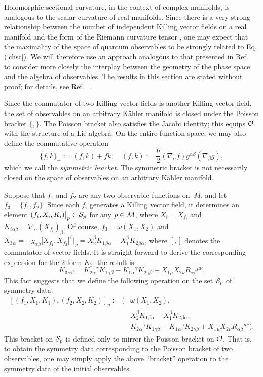 \documentclass[12pt,aps,eqsecnum,tighten]{revtex4-2}
\def\be{\begin{equation}}
\def\ee{\end{equation}}
\def\a{\alpha}
\def\b{\beta}
\def\c{\gamma}
\def\grad{\nabla}
\def\M{{\cal M}}
\def\w{\omega}
\newcommand{\hvf}[1]{{X_{#1}}}
\begin{document}
Holomorphic sectional curvature, in the context of complex manifolds,
is analogous to the scalar curvature of real manifolds.  Since there
is a very strong relationship between the number of independent
Killing vector fields on a real manifold and the form of the Riemann
curvature tensor \cite{ashtekar}, one may expect that the maximality
of the space of quantum observables to be strongly related to
Eq. (\ref{chsc}).  We will therefore use an approach analogous to that
presented in Ref.~\cite{ashtekar} to consider more closely the
interplay between the geometry of the phase space and the algebra of
observables.  The results in this section are stated without proof;
for details, see Ref.~ \cite{thesis}.

Since the commutator of two Killing vector fields is another Killing
vector field, the set of observables on an arbitrary K\"ahler manifold
is closed under the Poisson bracket $\{,\}$.  The Poisson bracket also
satisfies the Jacobi identity; this equips ${\cal O}$ with the
structure of a Lie algebra.  On the entire function space, we may also
define the commutative operation \be \{f, k\}_+ := (f, k) + fk, \quad
(f, k) := \frac{\hbar}{2} (\grad_\a f) g^{\a\b} (\grad_\b g), \ee
which we call the {\em symmetric bracket}.  The symmetric bracket is
not necessarily closed on the space of observables on an arbitrary
K\"ahler manifold.

Suppose that $f_1$ and $f_2$ are any two observable functions on $\
M$, and let $f_3 = \{f_1, f_2 \}$.  Since each $f_i$ generates a
Killing vector field, it determines an element $(f_i, X_i, K_i)\big|_p
\in {\cal S}_p$ for any $p \in \M$, where $X_i = \hvf{f_i}$ and
$K_i{}_{\a\b} = \grad_\a(\hvf{f_i})_\b$.  Of course, $f_3 = \w(X_1,
X_2)$ and $X_3{}_\a = -g_{\a\b} \big[\hvf{f_1}, \hvf{f_2}\big]^\b
\big|_p = X_2^\b K_1{}_{\b\a} - X_1^\b K_2{}_{\b\a}$, where $[,]$
denotes the commutator of vector fields.  It is straight-forward to
derive the corresponding expression for the 2-form $K_3$; the result
is \be K_3{}_{\a\b} = K_2{}_\a{}^\c K_1{}_{\c\b} - K_1{}_\a{}^\c
K_2{}_{\c\b} + X_1{}_\mu X_2{}_\nu R_{\a\b}{}^{\mu\nu}.  \ee This fact
suggests that we define the following operation on the set ${\cal
S}_p$ of symmetry data: 
%
\be \label{pb_p}
\begin{array}{ll}
	\left[ (f_1, X_1, K_1), (f_2, X_2, K_2) \right]_p :=
	\bigg(&
		\w(X_1, X_2), \\
		&  X_2^\b K_1{}_{\b\a} - X_1^\b K_2{}_{\b\a}, \\
		&  K_2{}_\a{}^\c  K_1{}_{\c\b} -
		   K_1{}_\a{}^\c  K_2{}_{\c\b}
		   + X_1{}_\mu X_2{}_\nu R_{\a\b}{}^{\mu\nu} \bigg).
\end{array}
\ee
%
This bracket on ${\cal S}_p$ is defined only to mirror the Poisson
bracket on ${\cal O}$.  That is, to obtain the symmetry data
corresponding to the Poisson bracket of two observables, one may
simply apply the above ``bracket'' operation to the symmetry data of
the initial observables. 
\end{document}
